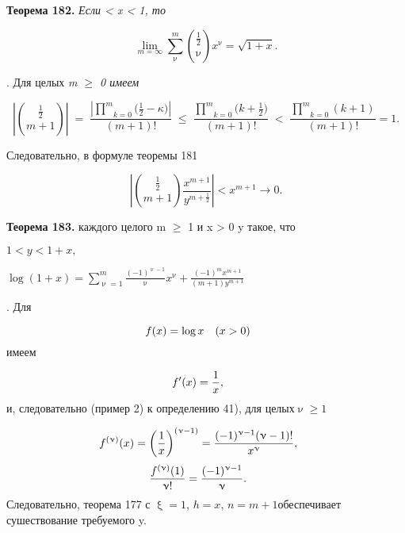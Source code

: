 \documentclass[a5paper]{book}
\begin{document}
    
   
    {\bfseries \:Теорема 182. }\itshape Если   < \itshape x \upshape < 1, \itshape то \upshape \par

    $$\lim_{m = \infty} \sum_{\upnu}^{m} {{\frac{1}{2}} \choose{\upnu}} x^{\upnu} = \sqrt{1 + x}.$$

    . Для целых \itshape m \upshape $\geqslant$ 0 имеем \par \par
    \noindent $$\left| {\frac{1}{2} \choose {m + 1}}\right| \;= \; \frac{\left| \underset{k = 0}{\overset{m}\prod} \Big(\frac{1}{2} - \kappa \Big)\right|}{(m+1)!} \; \leqslant \; \frac{ \underset{k = 0}{\overset{m}\prod}\Big(k + \frac{1}{2}\Big)}{(m + 1)!} \;<\;  \frac{\underset{k = 0}{\overset{m}\prod} (k + 1)}{(m+1)!} = 1.$$ \par
   
     \noindent \;\;\:Следовательно, в формуле теоремы 181\par
    $$ \left|  {\frac{1}{2} \choose {m + 1}} \frac{x^{m+1}}{y^{m + \frac{1}{2}}} \right| < x^{m+1} \to 0. $$
   
    {\bfseries \:Теорема 183. } каждого целого m $\geqslant$ 1 и x > 0 \; y\; такое,\; что \upshape \par
    \begin{center}
  $ 1 < y < 1 + x,  $    
   \end{center}
   \begin{center}
    $ \log{}{(1+x)}  =\sum\limits_{\upnu = 1}^{m} {\frac{(-1)^{\upnu - 1}}{\upnu}}x^{\upnu} + {\frac{(-1)^{m}x^{m+1}}{(m+1)y^{m+1}}} $    
   \end{center}

     . Для\par
    $$\hspace{-5mm} f(x) = \log{}{x} \quad(x>0) $$
     имеем\par
    $$\hspace{-5mm} f'(x) = \frac{1}{x}, $$
    и, следовательно (пример 2) к определению 41), для целых\linebreak $\upnu \geqslant 1$ \par
    $$\hspace{-5mm}f^{(\upnu)}(x) = \left({\frac{1}{x}}\right)^{(\upnu - 1)} = {\frac{(-1)^{\upnu - 1}(\upnu - 1)!}{x^{\upnu}}},$$
    $$\hspace{-5mm} {\frac{f^{(\upnu)}(1)}{\upnu!}} = {\frac{(-1)^{\upnu-1}}{\upnu}}. $$
   Следовательно, теорема 177 с $\upxi = 1$, $ h = x$, $n = m + 1$\linebreak обеспечивает сушествование требуемого y.\par 
   \quad \quad \quad \quad\quad \quad\quad\quad\quad\quad\quad\quad\quad\quad\quad\quad\quad\quad\quad\quad
\end{document}
